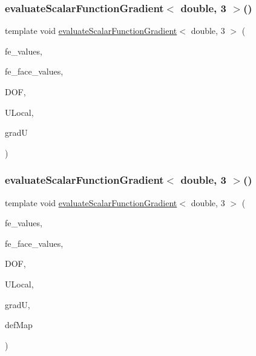 \mbox{\label{function_evaluations_8cc_a0a5f51dad78d15ef40ed772bb4eeea4c}} 
\subsubsection{\texorpdfstring{evaluateScalarFunctionGradient$<$ double, 3 $>$()}{evaluateScalarFunctionGradient< double, 3 >()}\hspace{0.1cm}{\footnotesize\ttfamily [3/4]}}
{\footnotesize\ttfamily template void \mbox{\hyperlink{group___evaluation_functions_gabedd4ae2841d2332ed0df0513b189e34}{evaluate\+Scalar\+Function\+Gradient}}$<$ double, 3 $>$ (\begin{DoxyParamCaption}\item[{const F\+E\+Values$<$ 3 $>$ \&}]{fe\+\_\+values,  }\item[{const F\+E\+Face\+Values$<$ 3 $>$ \&}]{fe\+\_\+face\+\_\+values,  }\item[{unsigned int}]{D\+OF,  }\item[{Table$<$ 1, double $>$ \&}]{U\+Local,  }\item[{Table$<$ 2, double $>$ \&}]{gradU }\end{DoxyParamCaption})}

\mbox{\label{function_evaluations_8cc_a121295365acb762462c0f9812a5fc118}} 
\subsubsection{\texorpdfstring{evaluateScalarFunctionGradient$<$ double, 3 $>$()}{evaluateScalarFunctionGradient< double, 3 >()}\hspace{0.1cm}{\footnotesize\ttfamily [4/4]}}
{\footnotesize\ttfamily template void \mbox{\hyperlink{group___evaluation_functions_gabedd4ae2841d2332ed0df0513b189e34}{evaluate\+Scalar\+Function\+Gradient}}$<$ double, 3 $>$ (\begin{DoxyParamCaption}\item[{const F\+E\+Values$<$ 3 $>$ \&}]{fe\+\_\+values,  }\item[{const F\+E\+Face\+Values$<$ 3 $>$ \&}]{fe\+\_\+face\+\_\+values,  }\item[{unsigned int}]{D\+OF,  }\item[{Table$<$ 1, double $>$ \&}]{U\+Local,  }\item[{Table$<$ 2, double $>$ \&}]{gradU,  }\item[{\mbox{\hyperlink{structdeformation_map}{deformation\+Map}}$<$ double, 3 $>$ \&}]{def\+Map }\end{DoxyParamCaption})}

